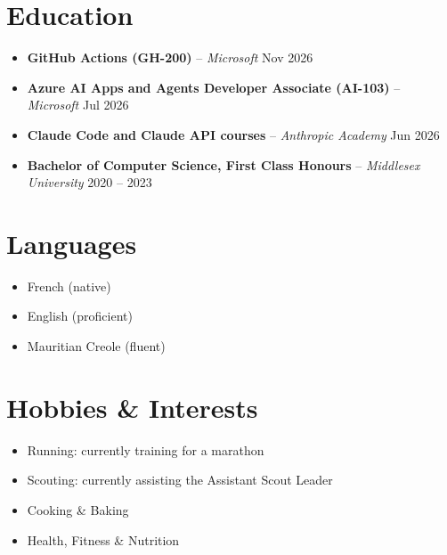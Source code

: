 \documentclass[a4paper,11pt]{article}
\newcommand{\resumeItem}[1]{
  \item\small{
    {#1 \vspace{-2pt}}
  }
}
\newcommand{\resumeItemListStart}{\begin{itemize}[itemsep=2pt, topsep=3pt, parsep=0pt]}
\newcommand{\resumeItemListEnd}{\end{itemize}\vspace{4pt}}
\begin{document}
\section{Education}
  \resumeItemListStart
    \item\small{\textbf{GitHub Actions (GH-200)} -- \textit{Microsoft} \hfill Nov 2026}
    \item\small{\textbf{Azure AI Apps and Agents Developer Associate (AI-103)} -- \textit{Microsoft} \hfill Jul 2026}
    \item\small{\textbf{Claude Code and Claude API courses} -- \textit{Anthropic Academy} \hfill Jun 2026}
    \item\small{\textbf{Bachelor of Computer Science, First Class Honours} -- \textit{Middlesex University} \hfill 2020 -- 2023}
  \resumeItemListEnd

\section{Languages}
  \resumeItemListStart
    \resumeItem{French (native)}
    \resumeItem{English (proficient)}
    \resumeItem{Mauritian Creole (fluent)}
  \resumeItemListEnd

\section{Hobbies \& Interests}
  \resumeItemListStart
    \resumeItem{Running: currently training for a marathon}
    \resumeItem{Scouting: currently assisting the Assistant Scout Leader}
    \resumeItem{Cooking \& Baking}
    \resumeItem{Health, Fitness \& Nutrition}
  \resumeItemListEnd
\end{document}
